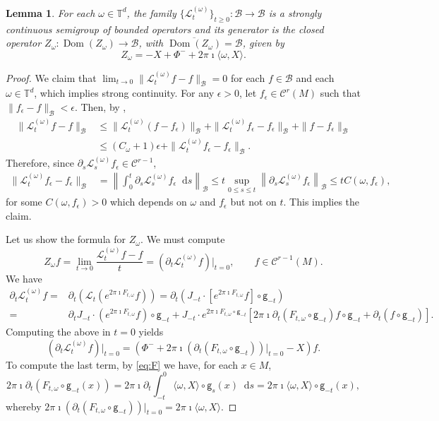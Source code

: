 \documentclass[11pt,letterpaper]{amsart}
\newcommand \cL {{\mathcal L}}
\newcommand \T {{ \mathbb T}}
\newcommand \cB {{\mathscr B}}
\newcommand \bT {{\mathbb T}}
\newcommand \cC {{\mathscr{C}}}
\newcommand{\geo}{\mathsf{g}}
\newcommand*{\diff}{\mathop{}\!\mathrm{d}}
\newtheorem {lemma}[theorem]{Lemma}
\theoremstyle{definition}
\begin{document}
\begin{lemma}\label{lem:generator}
For each $\omega \in \bT^d$, the family $\{\cL^{(\omega)}_t\}_{t\ge 0}:\cB \to \cB$ is a strongly continuous semigroup of bounded operators and its generator is the closed operator $Z_\omega:\operatorname{Dom}(Z_\omega)\to \cB$, with $\overline{\operatorname{Dom}(Z_\omega)}=\cB$, given by 
\[
Z_\omega= - X+\Phi^- +2\pi \imath \langle \omega, X \rangle.
\]
\end{lemma}
\begin{proof}
We claim that $\lim_{t\to 0}\|\cL_t^{(\omega)}f-f\|_{\cB}=0$ for each $f\in \cB$ and each $\omega \in \T^d$, which implies strong continuity. 
For any $\epsilon >0$, let  $  f_\epsilon \in \cC^{r}(M)$ such that $\| f_\epsilon- f \|_{\cB}<\epsilon$.
Then, by ,
\[
\begin{split}
\|\cL_t^{(\omega)} f- f\|_{\cB} &\le \|\cL_t^{(\omega)}( f- f_\epsilon)\|_{\cB}+\|\cL_t^{(\omega)} f_\epsilon- f_\epsilon \|_{\cB}+\| f- f_\epsilon\|_{\cB} \\
&\le (C_\omega+1) \epsilon + \|\cL_t^{(\omega)} f_\epsilon- f_\epsilon \|_{\cB}.
\end{split}
\]
Therefore, since $\partial_{s} {\cL_s^{(\omega)}}f_\epsilon \in \cC^{r-1}$,
\[
\begin{split}
\|\cL_t^{(\omega)} f_\epsilon- f_\epsilon\|_{\cB} & =\left\|\int_0^t \partial_{s} {\cL_s^{(\omega)}}f_\epsilon {\diff s} \right\|_{\cB} \leq t\sup _{0\le s\le t}\left\|\partial_{s} {\cL_s^{(\omega)}}f_\epsilon \right\|_{\cB} \leq t C(\omega,f_\epsilon),
\end{split}
\]
for some $C(\omega,f_\epsilon)>0$ which depends on $\omega$ and $f_\epsilon$ but not on $t$. This implies the claim.


Let us show the formula for $Z_\omega$. We must compute 
\[
Z_\omega  f=\lim_{t\to 0} \dfrac{\cL_t^{(\omega)} f- f}{t}=(\partial_t\cL_t^{(\omega)}  f)|_{t=0}, \qquad  f\in \cC^{r-1}(M).
\]
We have
\[
\begin{split}
\partial_t\cL_t^{(\omega)}  f =& \partial_t(\cL_t(e^{2\pi \imath F_{t,\omega}} f))=\partial_t(J_{-t}\cdot [e^{2\pi \imath F_{t,\omega}} f]\circ \geo_{-t})\\
=&\partial_t J_{-t}  \cdot (e^{2\pi \imath F_{t,\omega}} f)\circ \geo_{-t}+J_{-t}\cdot  e^{2\pi \imath F_{t,\omega}\circ \geo_{-t}} [2\pi \imath \partial_t(F_{t,\omega}\circ \geo_{-t})  f\circ \geo_{-t}+\partial_t( f\circ \geo_{-t})].
\end{split}
\]
Computing the above in $t=0$ yields
\[
(\partial_t\cL_t^{(\omega)}  f)|_{t=0}=\left(\Phi^- +2\pi \imath (\partial_t(F_{t,\omega}\circ \geo_{-t}))|_{t=0}-X \right) f.
\]
To compute the last term, by \eqref{eq:F} we have, for each $x\in M$,
\[
2\pi \imath \partial_t(F_{t,\omega}\circ \geo_{-t}(x))=2\pi \imath \partial_t \int_{-t}^0 \langle \omega, X \rangle\circ \geo_{s}(x) \diff s= 2\pi \imath \langle \omega, X \rangle\circ \geo_{-t}(x),
\]
whereby $2\pi \imath (\partial_t(F_{t,\omega}\circ \geo_{-t}))|_{t=0}=2\pi \imath \langle \omega, X \rangle$.
\end{proof}
\end{document}
